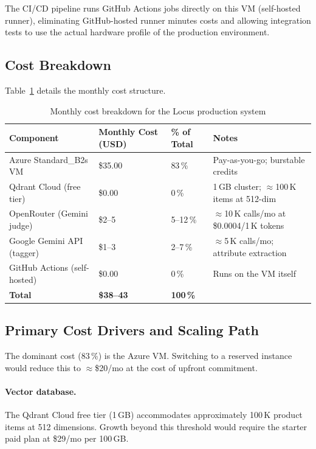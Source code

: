 \documentclass[12pt]{article}
\begin{document}
The CI/CD pipeline runs GitHub Actions jobs directly on this VM (self-hosted runner), eliminating GitHub-hosted runner minutes costs and allowing integration tests to use the actual hardware profile of the production environment.

\subsection{Cost Breakdown}

Table~\ref{tab:cost} details the monthly cost structure.

\begin{table}[H]
\centering
\small
\begin{tabular}{@{}llll@{}}
\toprule
\textbf{Component} & \textbf{Monthly Cost (USD)} & \textbf{\% of Total} & \textbf{Notes} \\ \midrule
Azure Standard\_B2s VM  & \$35.00  & 83\,\% & Pay-as-you-go; burstable credits \\
Qdrant Cloud (free tier) & \$0.00  & 0\,\%  & 1\,GB cluster; $\approx$100\,K items at 512-dim \\
OpenRouter (Gemini judge)& \$2--5  & 5--12\,\% & $\approx$10\,K calls/mo at \$0.0004/1\,K tokens \\
Google Gemini API (tagger)& \$1--3  & 2--7\,\% & $\approx$5\,K calls/mo; attribute extraction \\
GitHub Actions (self-hosted) & \$0.00 & 0\,\%  & Runs on the VM itself \\ \midrule
\textbf{Total}           & \textbf{\$38--43} & \textbf{100\,\%} & \\ \bottomrule
\end{tabular}
\caption{Monthly cost breakdown for the Locus production system}
\label{tab:cost}
\end{table}

\subsection{Primary Cost Drivers and Scaling Path}

The dominant cost (83\,\%) is the Azure VM. Switching to a reserved instance would reduce this to $\approx$\$20/mo at the cost of upfront commitment.

\paragraph{Vector database.} The Qdrant Cloud free tier (1\,GB) accommodates approximately 100\,K product items at 512 dimensions. Growth beyond this threshold would require the starter paid plan at \$29/mo per 100\,GB.
\end{document}
